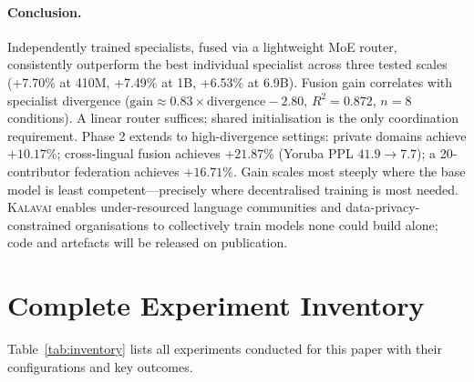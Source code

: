 \documentclass{article}
\newcommand{\kalavai}{\textsc{Kalavai}\xspace}
\begin{document}
\paragraph{Conclusion.} { Independently trained specialists, fused via a lightweight MoE router, consistently outperform the best individual specialist across three tested scales (+7.70\% at 410M, +7.49\% at 1B, +6.53\% at 6.9B). Fusion gain correlates with specialist divergence ($\text{gain} \approx 0.83 \times \text{divergence} - 2.80$, $R^2 = 0.872$, $n{=}8$ conditions). A linear router suffices; shared initialisation is the only coordination requirement. Phase 2 extends to high-divergence settings: private domains achieve $+10.17\%$; cross-lingual fusion achieves $+21.87\%$ (Yoruba PPL $41.9\to7.7$); a 20-contributor federation achieves $+16.71\%$. Gain scales most steeply where the base model is least competent---precisely where decentralised training is most needed. \kalavai enables under-resourced language communities and data-privacy-constrained organisations to collectively train models none could build alone; code and artefacts will be released on publication.}






\appendix

\section{Complete Experiment Inventory}
\label{app:inventory}

Table~\ref{tab:inventory} lists all experiments conducted for this paper with their configurations and key outcomes.
\end{document}
